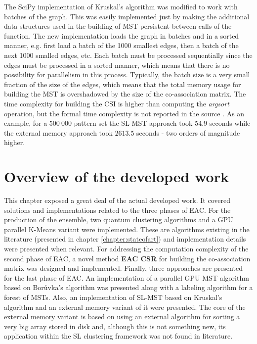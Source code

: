 The SciPy implementation of Kruskal's algorithm was modified to work with batches of the graph.
This was easily implemented just by making the additional data structures used in the building of MST persistent between calls of the function.
The new implementation loads the graph in batches and in a sorted manner, e.g. first load a batch of the 1000 smallest edges, then a batch of the next 1000 smalled edges, etc.
Each batch must be processed sequentially since the edges must be processed in a sorted manner, which means that there is no possibility for parallelism in this process.
Typically, the batch size is a very small fraction of the size of the edges, which means that the total memory usage for building the MST is overshadowed by the size of the co-association matrix.
The time complexity for building the CSI is higher than computing the \emph{argsort} operation, but the formal time complexity is not reported in the source \cite{AltetiAbad2007}.
As an example, for a $500 \: 000$ pattern set the SL-MST approach took $54.9$ seconds while the external memory approach took $2613.5$ seconds - two orders of magnitude higher.

\section{Overview of the developed work}
\label{sec:methodology overview}

This chapter exposed a great deal of the actual developed work.
It covered solutions and implementations related to the three phases of EAC.
For the production of the ensemble, two quantum clustering algorithms and a GPU parallel K-Means variant were implemented.
These are algorithms existing in the literature (presented in chapter \ref{chapter:stateofart}) and implementation details were presented when relevant.
For addressing the computation complexity of the second phase of EAC, a novel method \textbf{EAC CSR} for building the co-association matrix was designed and implemented.
Finally, three approaches are presented for the last phase of EAC.
An implementation of a parallel GPU MST algorithm based on Borůvka's algorithm was presented along with a labeling algorithm for a forest of MSTs.
Also, an implementation of SL-MST based on Kruskal's algorithm and an external memory variant of it were presented.
The core of the external memory variant is based on using an external algorithm for sorting a very big array stored in disk and, although this is not something new, its application within the SL clustering framework was not found in literature.

